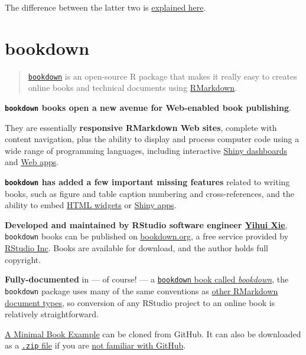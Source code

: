 \documentclass[]{book}
\theoremstyle{definition}
\theoremstyle{definition}
\theoremstyle{definition}
\theoremstyle{remark}
\begin{document}
The difference between the latter two is
\href{https://support.rstudio.com/hc/en-us/articles/217240558-What-is-the-difference-between-shinyapps-io-and-Shiny-Server-Pro-}{explained
here}.

\hypertarget{bookdown}{%
\section{bookdown}\label{bookdown}}

\begin{quote}
\href{https://github.com/rstudio/bookdown}{\texttt{bookdown}} is an
open-source R package that makes it really easy to creates online books
and technical documents using \protect\hyperlink{rmarkdown}{RMarkdown}.
\end{quote}

\textbf{\texttt{bookdown} books open a new avenue for Web-enabled book
publishing}.

They are essentially \textbf{responsive RMarkdown Web sites}, complete
with content navigation, plus the ability to display and process
computer code using a wide range of programming languages, including
interactive
\href{http://rstudio.github.io/shinydashboard/examples.html}{Shiny
dashboards} and \href{http://shiny.rstudio.com/gallery/}{Web apps}.

\textbf{\texttt{bookdown} has added a few important missing features}
related to writing books, such as figure and table caption numbering and
cross-references, and the ability to embed
\href{https://www.rstudio.com/products/shinyapps/}{HTML widgets} or
\href{http://shiny.rstudio.com/gallery/}{Shiny apps}.

\textbf{Developed and maintained by RStudio software engineer
\href{http://yihui.name}{Yihui Xie}}, \texttt{bookdown} books can be
published on \href{https://bookdown.org/}{bookdown.org}, a free service
provided by \href{https://www.rstudio.com/about/}{RStudio Inc}. Books
are available for download, and the author holds full copyright.

\href{https://bookdown.org/}{}

\textbf{Fully-documented} in --- of course! --- a
\href{https://bookdown.org/yihui/bookdown/}{\texttt{bookdown} book
called \emph{bookdown}}, the \texttt{bookdown} package uses many of the
same conventions as \protect\hyperlink{rmarkdown}{other RMarkdown
document types}, so conversion of any RStudio project to an online book
is relatively straightforward.

\href{https://github.com/rstudio/bookdown-demo}{A Minimal Book Example}
can be cloned from GitHub. It can also be downloaded as a
\href{https://github.com/rstudio/bookdown-demo/archive/master.zip}{\texttt{.zip}
file} if you are \href{http://rogerdudler.github.io/git-guide/}{not
familiar with GitHub}.
\end{document}
